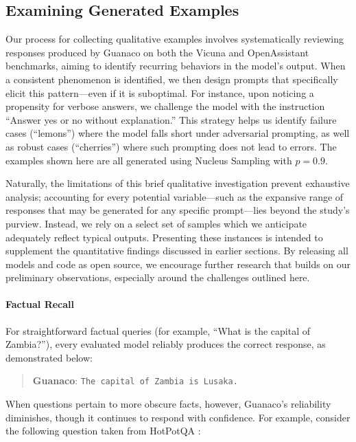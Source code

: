 \subsection{Examining Generated Examples}
\label{ssec:examples}

Our process for collecting qualitative examples involves systematically reviewing responses produced by {Guanaco} on both the Vicuna and OpenAssistant benchmarks, aiming to identify recurring behaviors in the model’s output. When a consistent phenomenon is identified, we then design prompts that specifically elicit this pattern—even if it is suboptimal. For instance, upon noticing a propensity for verbose answers, we challenge the model with the instruction ``Answer yes or no without explanation.'' This strategy helps us identify failure cases (``lemons'') where the model falls short under adversarial prompting, as well as robust cases (``cherries'') where such prompting does not lead to errors. The examples shown here are all generated using Nucleus Sampling \cite{holtzmancurious} with $p=0.9$.

Naturally, the limitations of this brief qualitative investigation prevent exhaustive analysis; accounting for every potential variable—such as the expansive range of responses that may be generated for any specific prompt—lies beyond the study’s purview. Instead, we rely on a select set of samples which we anticipate adequately reflect typical outputs. Presenting these instances is intended to supplement the quantitative findings discussed in earlier sections. By releasing all models and code as open source, we encourage further research that builds on our preliminary observations, especially around the challenges outlined here.

\paragraph{Factual Recall} For straightforward factual queries (for example, ``What is the capital of Zambia?''), every evaluated model reliably produces the correct response, as demonstrated below:

\begin{quote} 
    \textbf{Guanaco}:
    \texttt{The capital of Zambia is Lusaka.}
\end{quote}

When questions pertain to more obscure facts, however, {Guanaco}'s reliability diminishes, though it continues to respond with confidence. For example, consider the following question taken from HotPotQA \citep{yang2018hotpotqa}:

